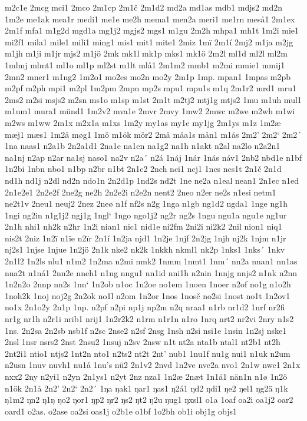 m2c1e
2mcg
mci1
2mco
2m1cp
2m1č
2m1d2
md2a
md1as
mdb1
mdjs2
md2n
1m2e
me1ak
mea1r
medi1
me1e
me2h
mema1
men2a
meri1
me1rn
meså1
2m1ex
2m1f
mfa1
m1g2d
mgd1a
mg1j2
mgjs2
mgs1
m1gu
2m2h
mhpa1
mh1t
1m2i
mie1
mi2f1
mila1
mile1
mili1
ming1
mis1
mit1
mite1
2miz
1mï
2m1í
2mj2
m1ja
m2jg
m1jh
m1ji
m1jr
mjs2
m1jö
2mk
mk1l
mk1p
mks1
mk1ö
2m2l
ml1d
ml2l
ml2m
1mlmj
mlmt1
ml1o
ml1p
ml2st
m1lt
mlå1
2m1m2
mmb1
m2mi
mmie1
mmij1
2mn2
mner1
m1ng2
1m2o1
mo2es
mo2n
mo2y
2m1p
1mp.
mpan1
1mpas
m2pb
m2pf
m2ph
mpi1
m2pl
1m2pm
2mpn
mp2s
mpu1
mpu1s
m1q
2m1r2
mrd1
mru1
2ms2
m2si
msjs2
m2sn
ms1o
m1sp
m1st
2m1t
m2tj2
mtj1g
mtjs2
1mu
m1uh
mul1
m1um1
mura1
münd1
1m2v2
mva1e
2mvr
2mvy
1mw2
2mwc
m2we
m2wh
m1wi
m2ws
m1ww
2m1x
m2x1a
m1xs
1m2y
my1as
my1e
my1jg
2m1ys
m1z
1m2æ
mæj1
mæs1
1m2ä
møg1
1mö
m1ök
mör2
2må
måa1s
mån1
m1ås
2m2'
2m2`
2m2´
1na
naas1
n2a1b
2n2a1d1
2na1e
na1en
na1g2
na1h
n1akt
n2al
na2lo
n2a2n1
na1nj
n2ap
n2ar
na1sj
naso1
na2v
n2a´
n2á
1náj
1nár
1nás
náv1
2nb2
nbd1e
n1bf
1n2bi
1nbn
nbo1
n1bp
n2br
n1bt
2n1c2
2nch
nci1
ncj1
1ncs
ncs1t
2n1č
2n1d
nd1h
nd1j
n2dl
nd2n
ndo1n
2n2d1p
1nd2s
nd2t
1ne
ne2a
n1eal
nean1
2n1ec
n1ed
2n1e2e1
2n2e2f
2ne2g
ne2h
2n2e2i
n2e2n
nent2
2neo
n2er
ne2s
n1esi
netm1
ne2t1v
2neu1
neuj2
2nez
2neø
n1f
nf2s
n2g
1nga
n1gb
ng1d2
ngda1
1nge
ng1h
1ngi
ng2in
n1g1j2
ngj1g
1ngl`
1ngo
ngo1j2
ng2r
ng2s
1ngu
ngu1a
ngu1e
ng1ur
2n1h
nhi1
nh2k
n2hr
1n2i
nian1
nic1
nid1e
ni2fm
2ni2i
ni2k2
2nil
nion1
niq1
nis2t
2niz
1n2ï
n1ïe
n2ïr
2n1í
1n2ja
njd1
1n2je
1njf
2n2jg
1njh
nj2k
1njm
n1jr
nj2s1
1njse
1njue
1n2jö
2n1k
nke2
nk2k
1nkkh
nkml1
nk2p
1nks1
1nks´
1nkv
2n1l2
1n2ls
nlu1
n1m2
1n2ma
n2mi
nmk2
1nmm
1nmt1
1nm´
nn2a
nnan1
nn1as
nna2t
n1ná1
2nn2e
nneh1
n1ng
nngu1
nn1id
nni1h
n2nin
1nnjg
nnjs2
n1nk
n2nn
1n2n2o
2nnp
nn2s
1nn`
1n2ob
n1oc
1n2oe
no1em
1noen
1noer
n2of
no1g
n1o2h
1noh2k
1noj
noj2g
2n2ok
no1l
n2om
1n2or
1nos
1nosč
no2si
1nost
no1t
1n2ov1
no1x
2n1o2y
2n1p
1np.
n2pf
n2pi
np1j
np2m
n2q
nraa1
n1rb
nr1d2
1nrf
nr2fi
nr1g
nr1h
n2r1i
nrib1
nrij1
1n2r2k2
n1rm
n1r1n
n1ro
1nrq
nrt2
nr2vi
2nry
n1s2
1ns.
2n2sa
2n2sb
nsb1f
n2sc
2nse2
n2sf
2nsg
1nsh
n2si
nsi1e
1nsin
1n2sj
nske1
2nsl
1nsr
nsrs2
2nst
2nsu2
1nsuj
n2sv
2nsw
n1t
nt2a
nta1b
ntal1
nt2b1
nt2h
2nt2i1
ntio1
ntjs2
1nt2n
nto1
n2ts2
nt2t
2nt'
nub1
1nu1f
nu1g
nui1
n1uk
n2um
n2usn
1nuv
nuvh1
nu1å
1nu's
nü2
2n1v2
2nvd
1n2ve
nve2a
nvo1
2n1w
nwc1
2n1x
nxx2
2ny
n2yi1
n2yn
2n1ys1
n2yt
2nz
nza1
1n2æ
2næt
1n1ä1
nän1n
n1ø
1n2ö
n1ök
2n1å
2n2'
2n2`
2n2´
1ŋa
ŋak1
ŋar1
ŋas1
ŋ2á1
ŋd2
ŋdi1
ŋe2
ŋel1
ŋg2ä
ŋ1k
ŋ1m2
ŋn2
ŋ1ŋ
ŋo2
ŋor1
ŋp2
ŋr2
ŋs2
ŋt2
ŋ2u
ŋug1
ŋxsl1
o1a
1oaf
oa2i
oa1j2
oar2
oard1
o2as.
o2ase
oa2si
oas1j
o2b1e
o1bf
1o2bh
ob1i
obj1g
objs1
